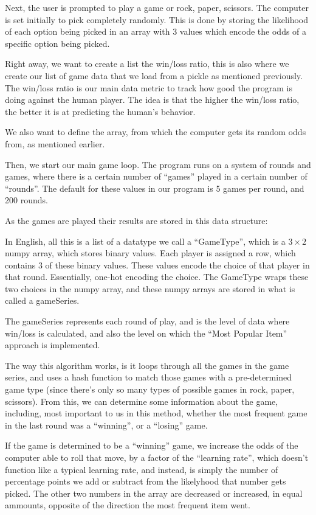 Next, the user is prompted to play a game or rock, paper, scissors. The computer
is set initially to pick completely randomly. This is done by storing the
likelihood of each option being picked in an array with 3 values which encode
the odds of a specific option being picked.

Right away, we want to create a list the win/loss ratio, this is also where we
create our list of game data that we load from a pickle as mentioned previously.
The win/loss ratio is our main data metric to track how good the program is
doing against the human player. The idea is that the higher the win/loss ratio,
the better it is at predicting the human's behavior.

We also want to define the array, from which the computer gets its random odds from,
as mentioned earlier.

Then, we start our main game loop. The program runs on a system of rounds and
games, where there is a certain number of ``games'' played in a certain number
of ``rounds''. The default for these values in our program is 5 games per round,
and 200 rounds.

As the games are played their results are stored in this data structure:

In English, all this is a list of a datatype we call a ``GameType'', which
is a \(3\times 2\) numpy array, which stores binary values. Each player is assigned a row,
which contains 3 of these binary values. These values encode the choice of that
player in that round. Essentially, one-hot encoding the choice. The GameType
wraps these two choices in the numpy array, and these numpy arrays are stored in
what is called a gameSeries.

The gameSeries represents each round of play, and is the level of data where
win/loss is calculated, and also the level on which the ``Most Popular Item''
approach is implemented.

The way this algorithm works, is it loops through all the games in the
game series, and uses a hash function to match those games with a pre-determined
game type (since there's only so many types of possible games in rock, paper, scissors).
From this, we can determine some information about the game, including, most important
to us in this method, whether the most frequent game in the last round was a ``winning'',
or a ``losing'' game.

If the game is determined to be a ``winning'' game, we increase the odds of the computer
able to roll that move, by a factor of the ``learning rate'', which doesn't function
like a typical learning rate, and instead, is simply the number of percentage points we
add or subtract from the likelyhood that number gets picked. The other two numbers in the
array are decreased or increased, in equal ammounts, opposite of the direction the most
frequent item went.

